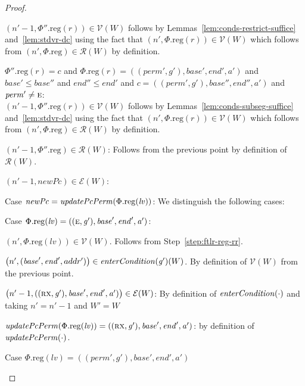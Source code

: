 \documentclass[a4paper]{article}
\newcommand{\var}[1]{\mathit{#1}}
\newcommand{\lv}{\var{lv}}
\newcommand{\gl}{\var{g}}
\newcommand{\addr}{\var{a}}
\newcommand{\start}{\var{base}}
\newcommand{\addrend}{\var{end}}
\newcommand{\perm}{\var{perm}}
\newcommand{\plainproj}[1]{\mathrm{#1}}
\newcommand{\memreg}[1][\Phi]{#1.\plainproj{reg}}
\newcommand{\plainfun}[2]{
  \ifthenelse{\equal{#2}{}}
  {\mathit{#1}}
  {\mathit{#1}(#2)}
}
\newcommand{\updatePcPerm}[1]{\plainfun{updatePcPerm}{#1}}
\newcommand{\entryCond}[1]{\plainfun{enterCondition}{#1}}
\newcommand{\asmType}{\plaindom{AsmType}}
\newcommand{\plaindom}[1]{\mathrm{#1}}
\newcommand{\intr}[2]{\mathcal{#1}}
\newcommand{\valueintr}[1]{\intr{V}{#1}}
\newcommand{\exprintr}[1]{\intr{E}{#1}}
\newcommand{\regintr}[1]{\intr{R}{#1}}
\newcommand{\stdvr}{\valueintr{\asmType}}
\newcommand{\stder}{\exprintr{\asmType}}
\newcommand{\stdrr}{\regintr{\asmType}}
\newcommand{\npair}[2][n]{\left(#1,#2 \right)}
\newcommand{\plainperm}[1]{\textsc{#1}}
\newcommand{\exec}{\plainperm{rx}}
\newcommand{\entry}{\plainperm{e}}
\begin{document}
\begin{proof}
\begin{enumproof}
\begin{enumproof}
\begin{enumproof}
        $\npair[n'-1]{\memreg[\Phi''](r)} \in \stdvr(W)$ follows by
        Lemmas~\ref{lem:conds-restrict-suffice} and~\ref{lem:stdvr-dc} using the
        fact that $\npair[n']{\memreg(r)}\in\stdvr(W)$
        which follows from $\npair[n']{\memreg}\in\stdrr(W)$ by
        definition.
      \item $\memreg[\Phi''](r) = \var{c}$ and $\memreg(r) =
        ((\perm',\gl'),\start',\addrend',\addr')$ and $\start' \leq \start''$ and
        $\addrend'' \leq \addrend'$ and $c =
        ((\perm',\gl'),\start'',\addrend'',\addr')$ and $\perm' \neq \entry$: \\
        $\npair[n'-1]{\memreg[\Phi''](r)} \in \stdvr(W)$ follows by
        Lemmas~\ref{lem:conds-subseg-suffice} and~\ref{lem:stdvr-dc} using the
        fact that $\npair[n']{\memreg(r)}\in\stdvr(W)$
        which follows from $\npair[n']{\memreg}\in\stdrr(W)$ by definition.
      \end{enumproof}
    \item $\npair[n'-1]{\memreg[\Phi'']}\in\stdrr(W)$: Follows from the previous
      point by definition of $\stdrr(W)$.
    \item $\npair[n'-1]{\var{newPc}} \in \stder(W)$:
      \begin{enumproof}
      \item Case $\var{newPc}= \updatePcPerm{\memreg(\lv)}$: We distinguish the
        following cases:
        \begin{enumproof}
        \item Case $\memreg(\lv) = ((\entry,\gl'),\start',\addrend',\addr')$:
          \begin{enumproof}
          \item $\npair[n']{\memreg(\lv)} \in \stdvr(W)$.  Follows from
            Step~\ref{step:ftlr-reg-rr}.
          \item $\npair[n']{(\start',\addrend',addr')} \in \entryCond{\gl'}(W)$.
            By definition of $\stdvr(W)$ from the previous point.
          \item $\npair[n'-1]{((\exec,\gl'),\start',\addrend',\addr')} \in
            \stder(W)$: By definition of $\entryCond{\cdot}$ and taking $n' =
            n'-1$ and $W' = W$
          \item $\updatePcPerm{\memreg(\lv)} =
            ((\exec,\gl'),\start',\addrend',\addr')$: by definition of $\updatePcPerm{\cdot}$.
          \end{enumproof}
        \item Case $\memreg(\lv) = ((\perm',\gl'),\start',\addrend',\addr')$

\end{enumproof}
\end{enumproof}
\end{enumproof}
\end{enumproof}
\end{proof}
\end{document}
